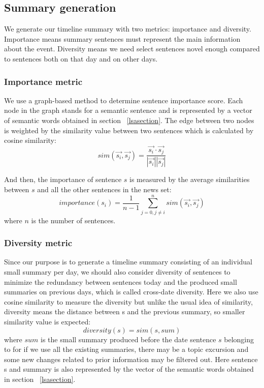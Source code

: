 \documentclass[runningheads,a4paper]{llncs}
\begin{document}
\subsection{Summary generation}
We generate our timeline summary with two metrics: importance and diversity. Importance means summary sentences must represent the main information about the event. Diversity means we need select sentences novel enough compared to sentences both on that day and on other days.

\subsubsection{Importance metric}
We use a graph-based method to determine sentence importance score. Each node in the graph stands for a semantic sentence and is represented by a vector of semantic words obtained in section ~\ref{lsasection}. The edge between two nodes is weighted by the similarity value between two sentences which is calculated by cosine similarity:
\begin{equation}
sim(\overrightarrow{s_i}, \overrightarrow{s_j}) = \frac{\overrightarrow{s_i} \cdot \overrightarrow{s_j} } {| \overrightarrow{s_i} || \overrightarrow{s_j} |}
\end{equation}

And then, the importance of sentence $s$ is measured by the average similarities between $s$ and all the other sentences in the news set:
\begin{equation}
importance(s_i) = \frac{1}{n-1} \sum_{j=0, j \neq i}^n sim(\overrightarrow{s_i}, \overrightarrow{s_j})
\end{equation}
where $n$ is the number of sentences.

\subsubsection{Diversity metric}
Since our purpose is to generate a timeline summary consisting of an individual small summary per day, we should also consider diversity of sentences to minimize the redundancy between sentences today and the produced small summaries on previous days, which is called cross-date diversity. Here we also use cosine similarity to measure the diversity but unlike the usual idea of similarity, diversity means the distance between s and the previous summary, so smaller similarity value is expected:
\begin{equation}
diversity(s) = sim(s, sum)
\end{equation}
where   $sum$ is the small summary produced before the date sentence $s$ belonging to for if we use all the existing summaries, there may be a topic excursion and some new changes related to prior information may be filtered out. Here sentence s and summary is also represented by the vector of the semantic words obtained in section ~\ref{lsasection}.
\end{document}
